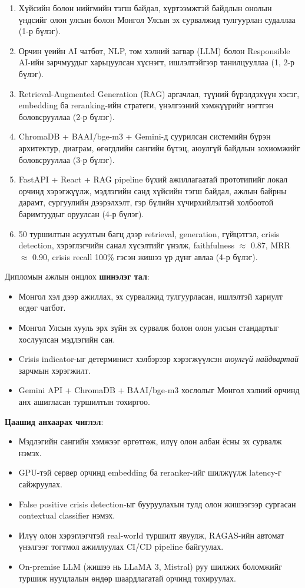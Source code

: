 \begin{enumerate}
    \item Хүйсийн болон нийгмийн тэгш байдал, хүртээмжтэй байдлын онолын үндсийг олон улсын болон Монгол Улсын эх сурвалжид тулгуурлан судаллаа (1-р бүлэг).
    \item Орчин үеийн AI чатбот, NLP, том хэлний загвар (LLM) болон Responsible AI-ийн зарчмуудыг харьцуулсан хүснэгт, ишлэлтэйгээр танилцууллаа (1, 2-р бүлэг).
    \item Retrieval-Augmented Generation (RAG) аргачлал, түүний бүрэлдэхүүн хэсэг, embedding ба reranking-ийн стратеги, үнэлгээний хэмжүүрийг нэгтгэн боловсрууллаа (2-р бүлэг).
    \item ChromaDB + BAAI/bge-m3 + Gemini-д суурилсан системийн бүрэн архитектур, диаграм, өгөгдлийн сангийн бүтэц, аюулгүй байдлын зохиомжийг боловсрууллаа (3-р бүлэг).
    \item FastAPI + React + RAG pipeline бүхий ажиллагаатай прототипийг локал орчинд хэрэгжүүлж, мэдлэгийн санд хүйсийн тэгш байдал, ажлын байрны дарамт, сургуулийн дээрэлхэлт, гэр бүлийн хүчирхийлэлтэй холбоотой баримтуудыг оруулсан (4-р бүлэг).
    \item 50 туршилтын асуултын багц дээр retrieval, generation, гүйцэтгэл, crisis detection, хэрэглэгчийн санал хүсэлтийг үнэлж, faithfulness $\approx$ 0.87, MRR $\approx$ 0.90, crisis recall 100\% гэсэн жишээ үр дүнг авлаа (4-р бүлэг).
\end{enumerate}

\noindent Дипломын ажлын онцлох \textbf{шинэлэг тал}:
\begin{itemize}
    \item Монгол хэл дээр ажиллах, эх сурвалжид тулгуурласан, ишлэлтэй хариулт өгдөг чатбот.
    \item Монгол Улсын хууль эрх зүйн эх сурвалж болон олон улсын стандартыг хослуулсан мэдлэгийн сан.
    \item Crisis indicator-ыг детерминист хэлбэрээр хэрэгжүүлсэн \textit{аюулгүй найдвартай} зарчмын хэрэгжилт.
    \item Gemini API + ChromaDB + BAAI/bge-m3 хослолыг Монгол хэлний орчинд анх ашигласан туршилтын тохиргоо.
\end{itemize}

\noindent \textbf{Цаашид анхаарах чиглэл}:
\begin{itemize}
    \item Мэдлэгийн сангийн хэмжээг өргөтгөж, илүү олон албан ёсны эх сурвалж нэмэх.
    \item GPU-тэй сервер орчинд embedding ба reranker-ийг шилжүүлж latency-г сайжруулах.
    \item False positive crisis detection-ыг бууруулахын тулд олон жишээгээр сургасан contextual classifier нэмэх.
    \item Илүү олон хэрэглэгчтэй real-world туршилт явуулж, RAGAS-ийн автомат үнэлгээг тогтмол ажиллуулах CI/CD pipeline байгуулах.
    \item On-premise LLM (жишээ нь LLaMA 3, Mistral) руу шилжих боломжийг туршиж нууцлалын өндөр шаардлагатай орчинд тохируулах.
\end{itemize}

